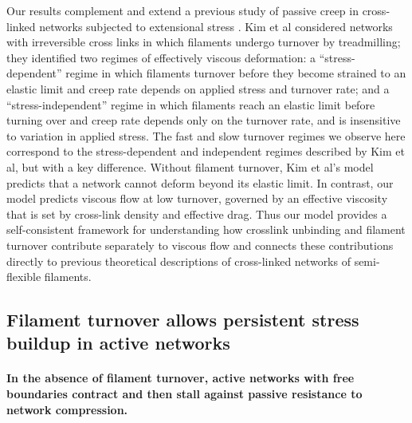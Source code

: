 \documentclass[10pt,letterpaper]{article}
\begin{document}
Our results complement and extend a previous study of passive creep in cross-linked networks subjected to extensional stress  \cite{Kim2014526}.  Kim et al considered networks with irreversible cross links in which filaments undergo turnover by treadmilling; they identified two regimes of effectively viscous deformation: a ``stress-dependent'' regime in which filaments turnover before they become strained to an elastic limit and creep rate depends on applied stress and turnover rate; and a ``stress-independent'' regime in which filaments reach an elastic limit before turning over and creep rate depends only on the turnover rate, and is insensitive to variation in applied stress. The fast and slow turnover regimes we observe here correspond to the stress-dependent and independent regimes described by Kim et al, but with a key difference. Without filament turnover, Kim et al's model predicts that a network cannot deform beyond its elastic limit.  In contrast, our model predicts viscous flow at low turnover, governed by an effective viscosity that is set by cross-link density and effective drag. Thus our model provides a self-consistent framework for understanding how crosslink unbinding and filament turnover contribute separately to viscous flow and connects these contributions directly to previous theoretical descriptions of cross-linked networks of semi-flexible filaments.






\subsection*{Filament turnover allows persistent stress buildup in active networks}

\paragraph{In the absence of filament turnover, active networks with free boundaries contract and then stall against passive resistance to network compression.}
\end{document}
